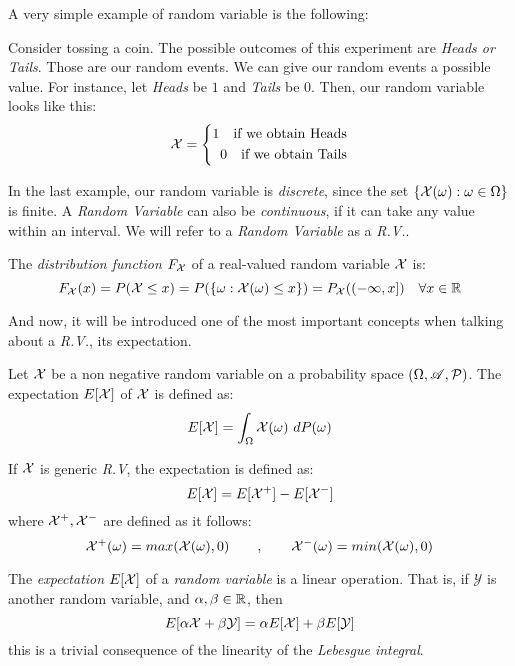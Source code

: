 A very simple example of random variable is the following:

\begin{nexample}
  Consider tossing a coin. The possible outcomes of this experiment are \emph{Heads or Tails}. Those are our random events. We can give our random events a possible value. For instance, let \emph{Heads} be $1$ and \emph{Tails} be 0. Then, our random variable looks like this:
  \begin{equation*}
      \mathcal {\mathcal{X}}  = \left\{ \begin{aligned}
  1 \quad \text{if we obtain Heads} \\
  0 \quad \text{if we obtain Tails}
\end{aligned}\right.
  \end{equation*}

\end{nexample}

In the last example, our random variable is \emph{discrete}, since the set $\{\mathcal{X}(\omega): \omega \in \Omega\}$ is finite. A \emph{Random Variable} can also be \emph{continuous}, if it can take any value within an interval.
We will refer to a \emph{Random Variable} as a \emph{R.V.}. \\

\begin{ndef}
The \emph{distribution function } $F_{\mathcal{X}}$ of a real-valued random variable $\mathcal{X}$ is:
$$
F_{\mathcal{X}}(x) = P(\mathcal{X} \leq x) = P(\{\omega : \mathcal{X}(\omega) \leq x\}) = P_{\mathcal{X}}((-\infty,x]) \quad \forall x \in \mathbb R
$$
\end{ndef}

And now, it will be introduced one of the most important concepts when talking about a \emph{R.V.}, its expectation.

\begin{ndef}
Let $\mathcal{X}$ be a non negative random variable on a probability space $(\Omega,\mathscr{A},\mathcal{P})$. The expectation $E[\mathcal{X}]$ of $\mathcal{X}$ is defined as:
$$
E[\X] = \int_\Omega \X(\omega) \ dP(\omega)
$$
\end{ndef}
If $\mathcal{X}$ is generic \emph{R.V}, the expectation is defined as:
$$
E[\mathcal{X}] = E[\mathcal{X}^+] - E[\mathcal{X}^-]
$$
where $\mathcal{X}^+,\mathcal{X}^-$ are defined as it follows:
$$
\mathcal{X}^+(\omega) = max(\mathcal{X}(\omega),0) \quad \quad , \quad \quad \mathcal{X}^-(\omega) = min(\mathcal{X}(\omega),0)
$$

The \emph{expectation} $E[\mathcal{X}]$ of a \emph{random variable} is a linear operation. That is, if $\mathcal Y$ is another random variable, and $\alpha,\beta \in \mathbb{R}$, then
$$
E[\alpha \mathcal{X} + \beta \mathcal Y] = \alpha E[\mathcal{X}] + \beta E[\mathcal Y]
$$
this is a trivial consequence of the linearity of the \emph{Lebesgue integral}.

